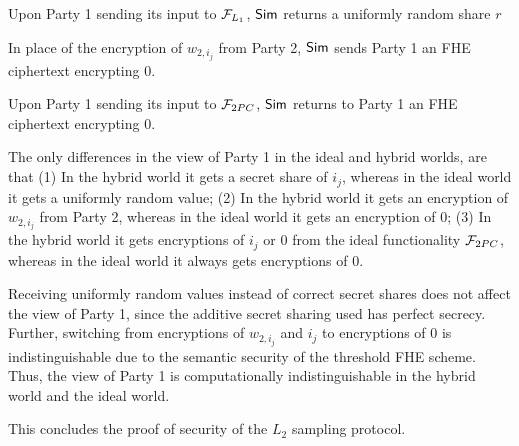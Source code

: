 \item Upon Party 1 sending its input to $\mathcal{F}_{L_1}$, ${\mathsf{Sim}}$ returns a uniformly random share $r$

\item In place of the encryption of $w_{2,i_j}$ from Party 2, ${\mathsf{Sim}}$ sends Party 1 an FHE ciphertext encrypting 0.

\item Upon Party 1 sending its input to $\mathcal{F}_{2PC}$, ${\mathsf{Sim}}$ returns to Party 1 an FHE ciphertext encrypting 0.
\EI


The only differences in the view of Party 1
in the ideal and hybrid worlds,
are that 
(1) In the hybrid world it gets a secret share of
$i_j$, whereas in the ideal world it gets a uniformly random value;
(2) In the hybrid world it gets an encryption of $w_{2,i_j}$ from Party 2, whereas in the ideal world it gets an encryption of 0;
(3) In the hybrid world it gets encryptions of
$i_j$ or $0$ from the ideal functionality
$\mathcal{F}_{2PC}$, whereas in the ideal world it always
gets encryptions of $0$.

Receiving uniformly random values instead of correct secret shares does not affect the view of Party 1, since the additive secret sharing used
has perfect secrecy.
Further, switching from encryptions
of $w_{2,i_j}$ and $i_j$ to encryptions of $0$
is indistinguishable due to the semantic security
of the threshold FHE scheme.
Thus, the view of Party 1 is computationally indistinguishable in the hybrid world and the ideal world.

This concludes the proof of security of the $L_2$
sampling protocol.
 

